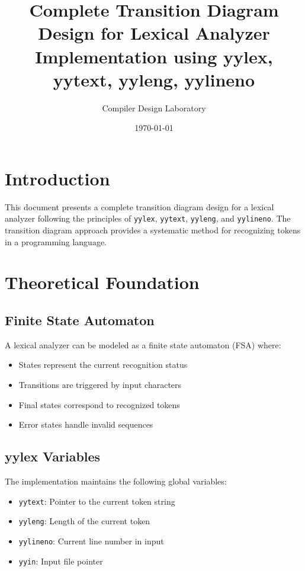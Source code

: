 \documentclass[12pt,a4paper]{article}
\title{\textbf{Complete Transition Diagram Design for Lexical Analyzer}\\
\large{Implementation using yylex, yytext, yyleng, yylineno}}
\author{Compiler Design Laboratory}
\date{\today}
\begin{document}
\maketitle

\tableofcontents
\newpage

\section{Introduction}
This document presents a complete transition diagram design for a lexical analyzer following the principles of \texttt{yylex}, \texttt{yytext}, \texttt{yyleng}, and \texttt{yylineno}. The transition diagram approach provides a systematic method for recognizing tokens in a programming language.

\section{Theoretical Foundation}

\subsection{Finite State Automaton}
A lexical analyzer can be modeled as a finite state automaton (FSA) where:
\begin{itemize}
    \item States represent the current recognition status
    \item Transitions are triggered by input characters
    \item Final states correspond to recognized tokens
    \item Error states handle invalid sequences
\end{itemize}

\subsection{yylex Variables}
The implementation maintains the following global variables:
\begin{itemize}
    \item \texttt{yytext}: Pointer to the current token string
    \item \texttt{yyleng}: Length of the current token
    \item \texttt{yylineno}: Current line number in input
    \item \texttt{yyin}: Input file pointer
\end{itemize}
\end{document}
